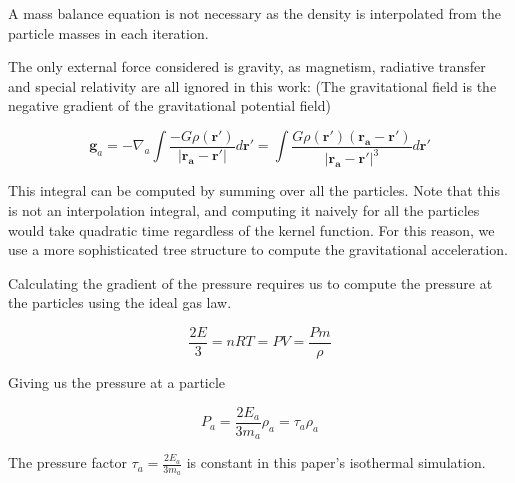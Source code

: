 \documentclass[../main.tex]{subfiles}
\begin{document}
A mass balance equation is not necessary as the density is interpolated from the particle masses in each iteration.

The only external force considered is gravity, as magnetism, radiative transfer and special relativity are all ignored in this work: (The gravitational field is the negative gradient of the gravitational potential field)

\begin{equation}
    \bm{g}_a = -\nabla_a\int\frac{-G\rho(\bm{r'})}{|\bm{r_a} - \bm{r'}|} d\bm{r'} = \int\frac{G\rho(\bm{r'})(\bm{r_a}-\bm{r'})}{|\bm{r_a}-\bm{r'}|^3} d\bm{r'}
\end{equation}

This integral can be computed by summing over all the particles. Note that this is not an interpolation integral, and computing it naively for all the particles would take quadratic time regardless of the kernel function. For this reason, we use a more sophisticated tree structure to compute the gravitational acceleration.

Calculating the gradient of the pressure requires us to compute the pressure at the particles using the ideal gas law.

\begin{equation}
    \frac{2E}{3} = nRT = PV = \frac{Pm}{\rho}
\end{equation}

Giving us the pressure at a particle

\begin{equation}
    P_a = \frac{2 E_a}{3 m_a} \rho_a = \tau_a \rho_a
\end{equation}

The pressure factor $\tau_a = \frac{2E_a}{3m_a}$ is constant in this paper's
isothermal simulation.
\end{document}
